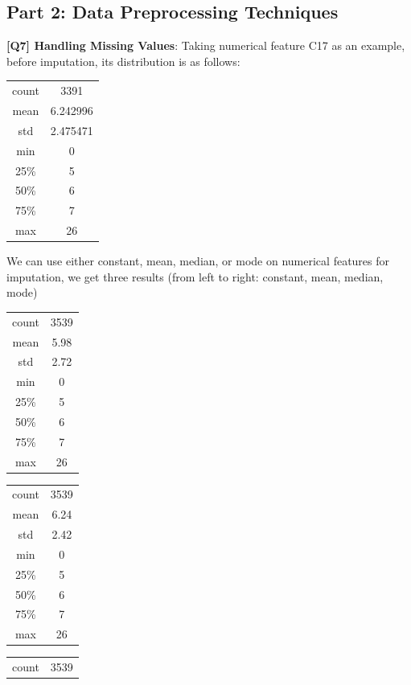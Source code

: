 \documentclass{article}
\begin{document}
\begin{description}
	\section*{Part 2: Data Preprocessing Techniques}
\item \textbf{[Q7] Handling Missing Values}: Taking numerical feature C17 as an example, before imputation, its distribution is as follows:
	\begin{center}
		\begin{tabular}{|c|c|}
			\hline
			count & 3391 \\
			mean & 6.242996 \\
			std & 2.475471 \\
			min & 0 \\
			25\% & 5 \\
			50\% & 6 \\
			75\% & 7 \\
			max & 26 \\
			\hline
		\end{tabular}
	\end{center}
	We can use either constant, mean, median, or mode on numerical features for imputation, we get three results (from left to right: constant, mean, median, mode)
	\begin{center}
		\begin{tabular}{|c|c|}
			\hline
			count & 3539 \\
			mean & 5.98 \\
			std & 2.72 \\
			min & 0 \\
			25\% & 5 \\
			50\% & 6 \\
			75\% & 7 \\
			max & 26 \\
			\hline
		\end{tabular}
		\begin{tabular}{|c|c|}
			\hline
			count & 3539 \\
			mean & 6.24 \\
			std & 2.42 \\
			min & 0 \\
			25\% & 5 \\
			50\% & 6 \\
			75\% & 7 \\
			max & 26 \\
			\hline
		\end{tabular}
		\begin{tabular}{|c|c|}
			\hline
			count & 3539\\

\end{tabular}
\end{center}
\end{description}
\end{document}
